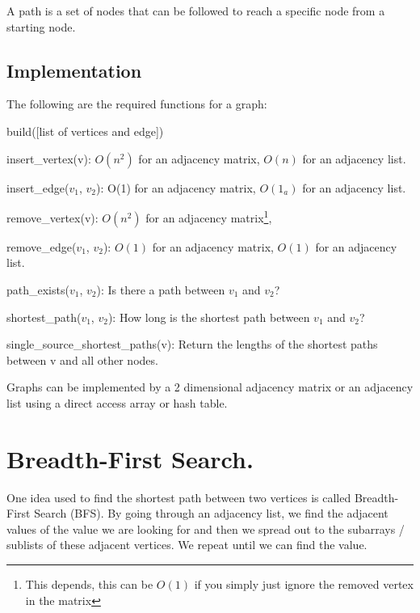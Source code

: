 \documentclass[11pt,a4paper,english]{article}
\begin{document}
A path is a set of nodes that can be followed to reach a specific node from a starting node.

\subsection{Implementation}

The following are the required functions for a graph:

\begin{itemize} {

    \item build([list of vertices and edge])
    \item insert\_vertex(v): $O(n^2)$ for an adjacency matrix, $O(n)$ for an adjacency list.
    \item insert\_edge($v_1$, $v_2$): O(1) for an adjacency matrix, $O(1_a)$ for an adjacency list.
    \item remove\_vertex(v): $O(n^2)$ for an adjacency matrix\footnote{This depends, this can be $O(1)$ if you simply just ignore the removed vertex in the matrix}, 
    \item remove\_edge($v_1$, $v_2$): $O(1)$ for an adjacency matrix, $O(1)$ for an adjacency list.
    \item path\_exists($v_1$, $v_2$): Is there a path between $v_1$ and $v_2$?
    \item shortest\_path($v_1$, $v_2$): How long is the shortest path between $v_1$ and $v_2$?
    \item single\_source\_shortest\_paths(v): Return the lengths of the shortest paths between v and all other nodes.

}
\end{itemize}

\bigskip
\noindent
Graphs can be implemented by a 2 dimensional adjacency matrix or an adjacency list using a direct access array or hash table.

\section{Breadth-First Search.}

One idea used to find the shortest path between two vertices is called Breadth-First Search (BFS). By going through an adjacency list, we find the adjacent values of the value we are looking for and then we spread out to the subarrays / sublists of these adjacent vertices. We repeat until we can find the value.
\end{document}
